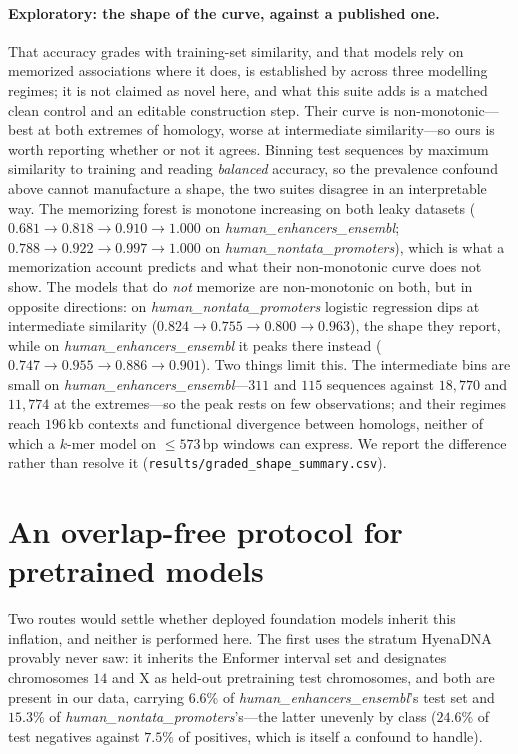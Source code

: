 \documentclass[11pt,a4paper]{article}
\begin{document}
\paragraph{Exploratory: the shape of the curve, against a published one.} That accuracy grades with training-set similarity, and that models rely on memorized associations where it does, is established by \citet{rafi2026} across three modelling regimes; it is not claimed as novel here, and what this suite adds is a matched clean control and an editable construction step. Their curve is non-monotonic---best at both extremes of homology, worse at intermediate similarity---so ours is worth reporting whether or not it agrees. Binning test sequences by maximum similarity to training and reading \emph{balanced} accuracy, so the prevalence confound above cannot manufacture a shape, the two suites disagree in an interpretable way. The memorizing forest is monotone increasing on both leaky datasets ($0.681\to0.818\to0.910\to1.000$ on \textit{human\_enhancers\_ensembl}; $0.788\to0.922\to0.997\to1.000$ on \textit{human\_nontata\_promoters}), which is what a memorization account predicts and what their non-monotonic curve does not show. The models that do \emph{not} memorize are non-monotonic on both, but in opposite directions: on \textit{human\_nontata\_promoters} logistic regression dips at intermediate similarity ($0.824\to0.755\to0.800\to0.963$), the shape they report, while on \textit{human\_enhancers\_ensembl} it peaks there instead ($0.747\to0.955\to0.886\to0.901$). Two things limit this. The intermediate bins are small on \textit{human\_enhancers\_ensembl}---$311$ and $115$ sequences against $18{,}770$ and $11{,}774$ at the extremes---so the peak rests on few observations; and their regimes reach $196$\,kb contexts and functional divergence between homologs, neither of which a $k$-mer model on ${\le}573$\,bp windows can express. We report the difference rather than resolve it (\texttt{results/graded\_shape\_summary.csv}).


\section{An overlap-free protocol for pretrained models}\label{sec:s-fm}
Two routes would settle whether deployed foundation models inherit this inflation, and neither is
performed here. The first uses the stratum HyenaDNA provably never saw: it inherits the Enformer
interval set and designates chromosomes $14$ and X as held-out pretraining test chromosomes, and
both are present in our data, carrying $6.6\%$ of \textit{human\_enhancers\_ensembl}'s test set and
$15.3\%$ of \textit{human\_nontata\_promoters}'s---the latter unevenly by class ($24.6\%$ of test
negatives against $7.5\%$ of positives, which is itself a confound to handle).
\end{document}
